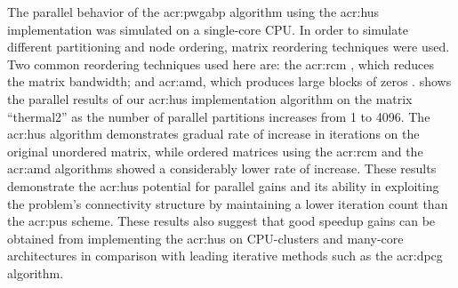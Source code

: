 The parallel behavior of the \gls{acr:pwgabp} algorithm using the \gls{acr:hus} implementation was simulated on a single-core CPU.
In order to simulate different partitioning and node ordering, matrix reordering techniques were used.
Two common reordering techniques used here are: the \gls{acr:rcm} \cite{bib:Cuthill1969RTBOSSM}, which reduces the matrix bandwidth; and \gls{acr:amd}, which produces large blocks of zeros \cite{bib:George1989TEOTMDOA}. 
 shows the parallel results of our \gls{acr:hus} implementation algorithm on the matrix ``thermal2'' as the number of parallel partitions increases from 1 to 4096.
The \gls{acr:hus} algorithm demonstrates gradual rate of increase in iterations on the original unordered matrix, while ordered matrices using the \gls{acr:rcm} and the \gls{acr:amd} algorithms showed a considerably lower rate of increase.
These results demonstrate the \gls{acr:hus} potential for parallel gains and its ability in exploiting the problem's connectivity structure by maintaining a lower iteration count than the \gls{acr:pus} scheme.
These results also suggest that good speedup gains can be obtained from implementing the \gls{acr:hus} on CPU-clusters and many-core architectures in comparison with leading iterative methods such as the \gls{acr:dpcg} algorithm.

